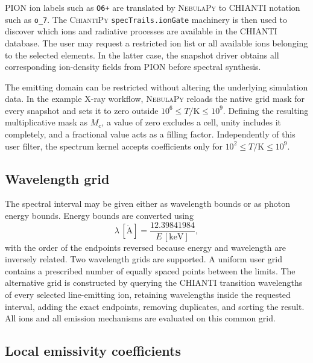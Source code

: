 PION ion labels such as \texttt{O6+} are translated by \textsc{NebulaPy} to
CHIANTI notation such as \texttt{o\_7}.  The \textsc{ChiantiPy}
\texttt{specTrails.ionGate} machinery is then used to discover which ions and
radiative processes are available in the CHIANTI database.  The user may
request a restricted ion list or all available ions belonging to the selected
elements.  In the latter case, the snapshot driver obtains all corresponding
ion-density fields from PION before spectral synthesis.

The emitting domain can be restricted without altering the underlying
simulation data.  In the example X-ray workflow, \textsc{NebulaPy} reloads the
native grid mask for every snapshot and sets it to zero outside
$10^6\leq T/\mathrm{K}\leq10^9$.  Defining the resulting multiplicative mask as
$M_c$, a value of zero excludes a cell, unity includes it completely, and a
fractional value acts as a filling factor.  Independently of this user filter,
the spectrum kernel accepts coefficients only for
$10^2\leq T/\mathrm{K}\leq10^9$.

\subsection{Wavelength grid}

The spectral interval may be given either as wavelength bounds or as photon
energy bounds.  Energy bounds are converted using
\begin{equation}
  \lambda\,[\mathring{\mathrm A}]
  = \frac{12.39841984}{E\,[\mathrm{keV}]},
\end{equation}
with the order of the endpoints reversed because energy and wavelength are
inversely related.  Two wavelength grids are supported.  A uniform user grid
contains a prescribed number of equally spaced points between the limits.  The
alternative grid is constructed by querying the CHIANTI transition wavelengths
of every selected line-emitting ion, retaining wavelengths inside the requested
interval, adding the exact endpoints, removing duplicates, and sorting the
result.  All ions and all emission mechanisms are evaluated on this common
grid.

\subsection{Local emissivity coefficients}

